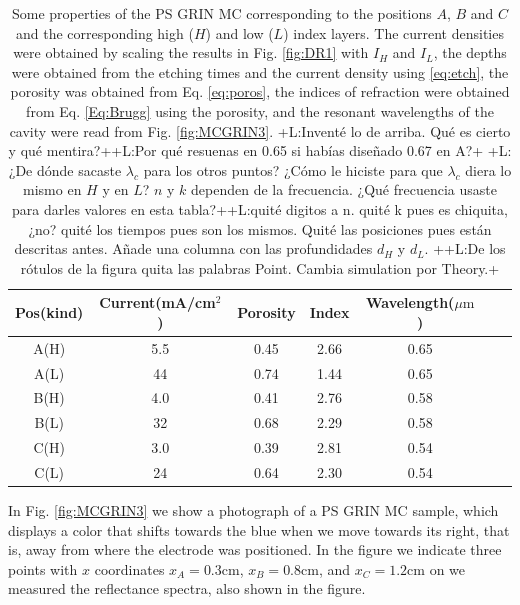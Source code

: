 \documentclass{article}
\newcommand{\notaL}[1]{{\color{blue}+L:#1+}}
\begin{document}
\begin{table}
  \centering
  \begin{tabular}{ccccccc}
    \hline
    Pos(kind)&Current(mA/cm$^2$)&Porosity&Index&Wavelength($\mu\text{m}$)\\
    \hline
    \hline
    A(H) & 5.5 & 0.45& 2.66& 0.65   \\
    A(L) & 44  & 0.74& 1.44& 0.65   \\
    B(H) & 4.0 & 0.41& 2.76& 0.58   \\
    B(L) & 32  & 0.68& 2.29& 0.58   \\
    C(H) & 3.0 & 0.39& 2.81&0.54    \\
    C(L) & 24  & 0.64& 2.30&0.54    \\
  \end{tabular}
  \caption{Some properties of the PS GRIN MC corresponding to the
    positions $A$, $B$ and $C$ and the corresponding high ($H$) and
    low ($L$) index layers. The current densities were obtained by
    scaling the results in Fig. \ref{fig:DR1} with $I_H$ and
    $I_L$, the depths were obtained from the etching
    times and the current density using \eqref{eq:etch}, the porosity
    was obtained from Eq. \eqref{eq:poros}, the indices of refraction
    were obtained from Eq. \eqref{Eq:Brugg} using the porosity, and
    the resonant wavelengths of the cavity were read from
    Fig. \ref{fig:MCGRIN3}.
    \notaL{Inventé lo de arriba. Qué es cierto y qué
      mentira?}\notaL{Por qué resuenas en 0.65 si habías diseñado
      0.67 en A?} \notaL{¿De dónde sacaste
        $\lambda_c$ para los otros puntos? ¿Cómo le hiciste para que
        $\lambda_c$ diera lo mismo en $H$ y en $L$? $n$ y $k$ dependen de la
        frecuencia. ¿Qué frecuencia usaste para darles valores en esta
        tabla?}\notaL{quité digitos a n. quité k pues es chiquita,
        ¿no? quité los tiempos pues son los mismos. Quité las
        posiciones pues están descritas antes. Añade una columna
        con las profundidades $d_H$ y $d_L$. }\notaL{De los rótulos de
      la figura quita las palabras Point. Cambia simulation por Theory.}}
	\label{tabla:1}
\end{table}
In Fig. \ref{fig:MCGRIN3} we show a photograph of a PS GRIN MC
sample, which displays a color that shifts towards the blue when we
move towards its right, that is, away from where the electrode was
positioned. In the figure we indicate three points with $x$ coordinates
$x_A=0.3\text{cm}$,  $x_B=0.8\text{cm}$, and $x_C=1.2\text{cm}$
on we measured the reflectance spectra, also shown in the figure.
\end{document}
